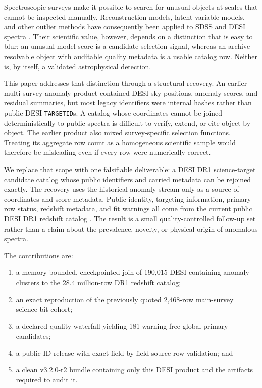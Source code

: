 \documentclass[twocolumn]{aastex701}
\newcommand{\releaseVersion}{v3.2.0-r2}
\begin{document}
Spectroscopic surveys make it possible to search for unusual objects at scales that cannot be
inspected manually.  Reconstruction models, latent-variable models, and other outlier methods
have consequently been applied to SDSS and DESI spectra \citep{Baron2017,Liang2023,Nicolaou2026}.
Their scientific value, however, depends on a distinction that is easy to blur: an unusual model
score is a candidate-selection signal, whereas an archive-resolvable object with auditable
quality metadata is a usable catalog row.  Neither is, by itself, a validated astrophysical
detection.

This paper addresses that distinction through a structural recovery.  An earlier multi-survey
anomaly product contained DESI sky positions, anomaly scores, and residual summaries, but most
legacy identifiers were internal hashes rather than public DESI \texttt{TARGETID}s.  A catalog
whose coordinates cannot be joined deterministically to public spectra is difficult to verify,
extend, or cite object by object.  The earlier product also mixed survey-specific selection
functions.  Treating its aggregate row count as a homogeneous scientific sample would therefore
be misleading even if every row were numerically correct.

We replace that scope with one falsifiable deliverable: a DESI DR1 science-target candidate
catalog whose public identifiers and carried metadata can be rejoined exactly.  The recovery
uses the historical anomaly stream only as a source of coordinates and score metadata.  Public
identity, targeting information, primary-row status, redshift metadata, and fit warnings all
come from the current public DESI DR1 redshift catalog \citep{DESI2025DR1}.  The result is a small
quality-controlled follow-up set rather than a claim about the prevalence, novelty, or physical
origin of anomalous spectra.

The contributions are:
\begin{enumerate}
\item a memory-bounded, checkpointed join of 190,015 DESI-containing anomaly clusters to the
28.4 million-row DR1 redshift catalog;
\item an exact reproduction of the previously quoted 2,468-row main-survey science-bit cohort;
\item a declared quality waterfall yielding 181 warning-free global-primary candidates;
\item a public-ID release with exact field-by-field source-row validation; and
\item a clean \releaseVersion{} bundle containing only this DESI product and the artifacts required to audit it.
\end{enumerate}
\end{document}
